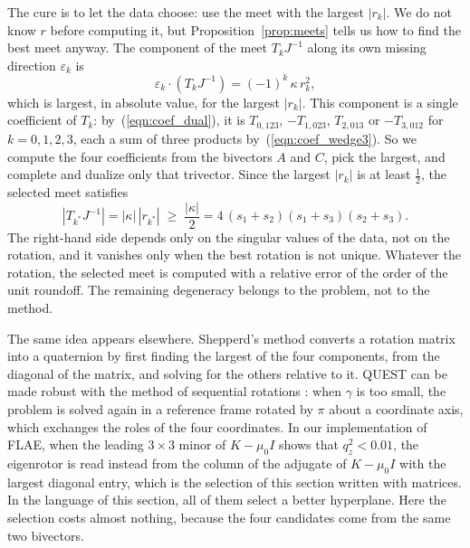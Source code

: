 \documentclass{birkjour}
\theoremstyle{definition}
\theoremstyle{remark}
\numberwithin{equation}{section}
\begin{document}
The cure is to let the data choose: use the meet with the largest $|r_k|$. We do not know $r$ before computing it, but Proposition~\ref{prop:meets} tells us how to find the best meet anyway. The component of the meet $T_k J^{-1}$ along its own missing direction $\varepsilon_k$ is
\begin{equation}
\label{eqn:own}
\varepsilon_k \cdot (T_k J^{-1}) = (-1)^k\, \kappa\, r_k^2,
\end{equation}
which is largest, in absolute value, for the largest $|r_k|$. This component is a single coefficient of $T_k$: by~(\ref{eqn:coef_dual}), it is $T_{0,123}$, $-T_{1,023}$, $T_{2,013}$ or $-T_{3,012}$ for $k = 0, 1, 2, 3$, each a sum of three products by~(\ref{eqn:coef_wedge3}). So we compute the four coefficients from the bivectors $A$ and $C$, pick the largest, and complete and dualize only that trivector. Since the largest $|r_k|$ is at least $\frac12$, the selected meet satisfies
\begin{equation}
\label{eqn:lower_bound}
|T_{k^*} J^{-1}| = |\kappa|\, |r_{k^*}| \;\geq\; \frac{|\kappa|}{2} = 4\, (s_1 + s_2)(s_1 + s_3)(s_2 + s_3).
\end{equation}
The right-hand side depends only on the singular values of the data, not on the rotation, and it vanishes only when the best rotation is not unique. Whatever the rotation, the selected meet is computed with a relative error of the order of the unit roundoff. The remaining degeneracy belongs to the problem, not to the method.

The same idea appears elsewhere. Shepperd's method \cite{Shepperd1978} converts a rotation matrix into a quaternion by first finding the largest of the four components, from the diagonal of the matrix, and solving for the others relative to it. QUEST can be made robust with the method of sequential rotations \cite{Shuster1981}: when $\gamma$ is too small, the problem is solved again in a reference frame rotated by $\pi$ about a coordinate axis, which exchanges the roles of the four coordinates. In our implementation of FLAE, when the leading $3 \times 3$ minor of $K - \mu_0 I$ shows that $q_z^2 < 0.01$, the eigenrotor is read instead from the column of the adjugate of $K - \mu_0 I$ with the largest diagonal entry, which is the selection of this section written with matrices. In the language of this section, all of them select a better hyperplane. Here the selection costs almost nothing, because the four candidates come from the same two bivectors.

\end{document}
